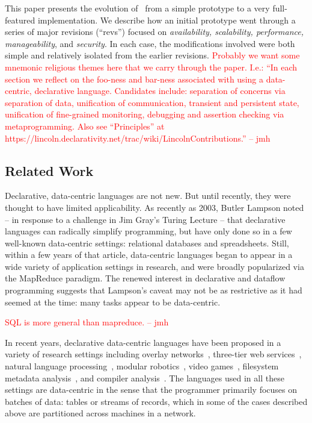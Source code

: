 \documentclass{sig-alternate}
\newcommand{\jmh}[1]{{\textcolor{red}{#1 -- jmh}}}
\begin{document}
This paper presents the evolution of \BOOM\ from a simple prototype to a very full-featured implementation.  We describe how an initial prototype went through a series of major revisions (``revs'') focused on {\em availability, scalability, performance, manageability}, and {\em security}.  In each case, the modifications involved were both simple and relatively isolated from the earlier revisions.  \jmh{Probably we want some mnemonic religious themes here that we carry through the paper. I.e.: ``In each section we reflect on the foo-ness and bar-ness associated with using a data-centric, declarative language.  Candidates include: separation of concerns via separation of data, unification of communication, transient and persistent state, unification of fine-grained monitoring, debugging and assertion checking via metaprogramming.  Also see ``Principles'' at https://lincoln.declarativity.net/trac/wiki/LincolnContributions.''}


\subsection{Related Work}
\label{sec:relwork}
Declarative, data-centric languages are not new.  But until recently, they were thought to have limited applicability.  As recently as 2003, Butler Lampson noted -- in response to a challenge in Jim Gray's Turing Lecture -- that declarative languages can radically simplify programming, but have only done so in a few well-known data-centric settings: relational databases and spreadsheets. Still, within a few years of that article, data-centric languages began to appear in a wide variety of application settings in research, and were broadly popularized via the MapReduce paradigm. The renewed interest in declarative and dataflow programming suggests that Lampson's caveat may not be as restrictive as it had seemed at the time: many tasks appear to be data-centric.

\jmh{SQL is more general than mapreduce.}

In recent years, declarative data-centric languages have been proposed in a variety of research settings including overlay networks~\cite{p2}, three-tier web services~\cite{hilda}, natural language processing~\cite{dyna}, modular robotics~\cite{meld}, video games~\cite{cornellgames}, filesystem metadata analysis~\cite{wiscfsck}, and compiler analysis~\cite{bddbddb}.  The languages used in all these settings are data-centric in the sense that the programmer primarily focuses on batches of data: tables or streams of records, which in some of the cases described above are partitioned across machines in a network.  
\end{document}
